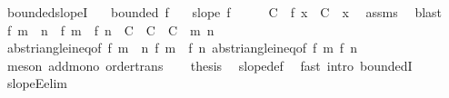 \begin{isabellebody}
\isanewline
{}\isamarkupfalse%
\ bounded{\isacharunderscore}{\kern0pt}slopeI{\isacharcolon}{\kern0pt}\isanewline
\ \ \ {\isachardoublequoteopen}bounded\ f{\isachardoublequoteclose}\isanewline
\ \ \ {\isachardoublequoteopen}slope\ f{\isachardoublequoteclose}\isanewline
%
\isadelimproof
%
\endisadelimproof
%
\isatagproof
{}\isamarkupfalse%
\ {\isacharminus}{\kern0pt}\isanewline
\ \ \isamarkupfalse%
\ C\ \ {\isachardoublequoteopen}{\isasymbar}f\ x{\isasymbar}\ {\isasymle}\ C{\isachardoublequoteclose}\ \ x\ \isamarkupfalse%
\ assms\ \isamarkupfalse%
\ blast\isanewline
\ \ \isamarkupfalse%
\ {\isachardoublequoteopen}{\isasymbar}f\ {\isacharparenleft}{\kern0pt}m\ {\isacharplus}{\kern0pt}\ n{\isacharparenright}{\kern0pt}\ {\isacharminus}{\kern0pt}\ {\isacharparenleft}{\kern0pt}f\ m\ {\isacharplus}{\kern0pt}\ f\ n{\isacharparenright}{\kern0pt}{\isasymbar}\ {\isasymle}\ C\ {\isacharplus}{\kern0pt}\ {\isacharparenleft}{\kern0pt}C\ {\isacharplus}{\kern0pt}\ C{\isacharparenright}{\kern0pt}{\isachardoublequoteclose}\ \ m\ n\isanewline
\ \ \ \ \isamarkupfalse%
\ abs{\isacharunderscore}{\kern0pt}triangle{\isacharunderscore}{\kern0pt}ineq{}{\isacharbrackleft}{\kern0pt}of\ {\isachardoublequoteopen}f\ {\isacharparenleft}{\kern0pt}m\ {\isacharplus}{\kern0pt}\ n{\isacharparenright}{\kern0pt}{\isachardoublequoteclose}\ {\isachardoublequoteopen}f\ m\ {\isacharplus}{\kern0pt}\ f\ n{\isachardoublequoteclose}{\isacharbrackright}{\kern0pt}\ abs{\isacharunderscore}{\kern0pt}triangle{\isacharunderscore}{\kern0pt}ineq{\isacharbrackleft}{\kern0pt}of\ {\isachardoublequoteopen}f\ m{\isachardoublequoteclose}\ {\isachardoublequoteopen}f\ n{\isachardoublequoteclose}{\isacharbrackright}{\kern0pt}\ \isamarkupfalse%
\ {\isacharparenleft}{\kern0pt}meson\ add{\isacharunderscore}{\kern0pt}mono\ order{\isacharunderscore}{\kern0pt}trans{\isacharparenright}{\kern0pt}\isanewline
\ \ \isamarkupfalse%
\ {\isacharquery}{\kern0pt}thesis\ \isamarkupfalse%
\ slope{\isacharunderscore}{\kern0pt}def\ \isamarkupfalse%
\ {\isacharparenleft}{\kern0pt}fast\ intro{\isacharcolon}{\kern0pt}\ boundedI{\isacharparenright}{\kern0pt}\isanewline
{}\isamarkupfalse%
%
\endisatagproof
{\isafoldproof}%
%
\isadelimproof
\isanewline
%
\endisadelimproof
\isanewline
{}\isamarkupfalse%
\ slopeE{\isacharbrackleft}{\kern0pt}elim{\isacharbrackright}{\kern0pt}{\isacharcolon}{\kern0pt}\isanewline

\end{isabellebody}
